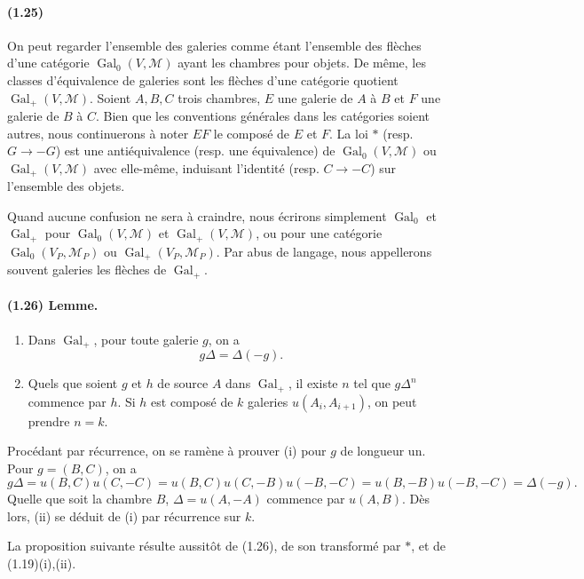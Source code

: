 \documentclass[10pt,a4paper]{article}
\begin{document}
\paragraph{(1.25)} On peut regarder l'ensemble des galeries comme étant l'ensemble des flèches d'une catégorie \(\operatorname{Gal}_0(V,\mathcal M)\) ayant les chambres pour objets. De même, les classes d'équivalence de galeries sont les flèches d'une catégorie quotient \(\operatorname{Gal}_+(V,\mathcal M)\). Soient \(A,B,C\) trois chambres, \(E\) une galerie de \(A\) à \(B\) et \(F\) une galerie de \(B\) à \(C\). Bien que les conventions générales dans les catégories soient autres, nous continuerons à noter \(EF\) le composé de \(E\) et \(F\). La loi \(*\) (resp. \(G\to-G\)) est une antiéquivalence (resp. une équivalence) de \(\operatorname{Gal}_0(V,\mathcal M)\) ou \(\operatorname{Gal}_+(V,\mathcal M)\) avec elle-même, induisant l'identité (resp. \(C\to-C\)) sur l'ensemble des objets.

Quand aucune confusion ne sera à craindre, nous écrirons simplement \(\operatorname{Gal}_0\) et \(\operatorname{Gal}_+\) pour \(\operatorname{Gal}_0(V,\mathcal M)\) et \(\operatorname{Gal}_+(V,\mathcal M)\), ou pour une catégorie \(\operatorname{Gal}_0(V_P,\mathcal M_P)\) ou \(\operatorname{Gal}_+(V_P,\mathcal M_P)\). Par abus de langage, nous appellerons souvent galeries les flèches de \(\operatorname{Gal}_+\).

\paragraph{(1.26) Lemme.}
\begin{enumerate}[label=(\roman*)]
\item Dans \(\operatorname{Gal}_+\), pour toute galerie \(g\), on a
\[
g\Delta=\Delta(-g).
\]
\item Quels que soient \(g\) et \(h\) de source \(A\) dans \(\operatorname{Gal}_+\), il existe \(n\) tel que \(g\Delta^n\) commence par \(h\). Si \(h\) est composé de \(k\) galeries \(u(A_i,A_{i+1})\), on peut prendre \(n=k\).
\end{enumerate}

Procédant par récurrence, on se ramène à prouver (i) pour \(g\) de longueur un. Pour \(g=(B,C)\), on a
\[
g\Delta=u(B,C)u(C,-C)=u(B,C)u(C,-B)u(-B,-C)
=u(B,-B)u(-B,-C)=\Delta(-g).
\]
Quelle que soit la chambre \(B\), \(\Delta=u(A,-A)\) commence par \(u(A,B)\). Dès lors, (ii) se déduit de (i) par récurrence sur \(k\).

La proposition suivante résulte aussitôt de (1.26), de son transformé par \(*\), et de (1.19)(i),(ii).
\end{document}
